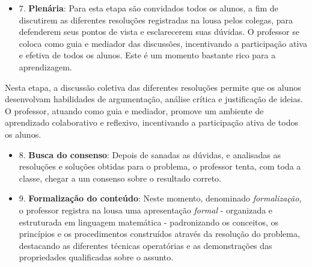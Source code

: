 
\begin{itemize}
    \item 7. \textbf{Plenária}: Para esta etapa são convidados todos os alunos, a fim de discutirem as diferentes resoluções registradas na lousa pelos colegas, para defenderem seus pontos de vista e esclarecerem suas dúvidas. O professor se coloca como guia e mediador das discussões, incentivando a participação ativa e efetiva de todos os alunos. Este é um momento bastante rico para a aprendizagem. \cite{BOLEMAAllevatoOnuchic2011}
\end{itemize}

Nesta etapa, a discussão coletiva das diferentes resoluções permite que os alunos desenvolvam habilidades de argumentação, análise crítica e justificação de ideias. O professor, atuando como guia e mediador, promove um ambiente de aprendizado colaborativo e reflexivo, incentivando a participação ativa de todos os alunos.


\begin{itemize}
    \item 8. \textbf{Busca do consenso}: Depois de sanadas as dúvidas, e analisadas as resoluções e soluções obtidas para o problema, o professor tenta, com toda a classe, chegar a um consenso sobre o resultado correto. \cite{BOLEMAAllevatoOnuchic2011}
\end{itemize}


\begin{itemize}
    \item 9. \textbf{Formalização do conteúdo}: Neste momento, denominado \textit{formalização}, o professor registra na lousa uma apresentação \textit{formal} - organizada e estruturada em linguagem matemática - padronizando os conceitos, os princípios e os procedimentos construídos através da resolução do problema, destacando as diferentes técnicas operatórias e as demonstrações das propriedades qualificadas sobre o assunto. \cite{BOLEMAAllevatoOnuchic2011}
\end{itemize}

